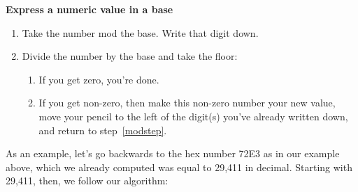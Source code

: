 \vspace{.1in}
\begin{framed}
\begin{samepage}
\textbf{Express a numeric value in a base}
\label{convertalgorithm}
\begin{enumerate}
\item \label{modstep} Take the number mod the base. Write that digit down.
\item \label{divstep} Divide the number by the base and take the floor:
    \begin{enumerate}
    \item \label{zerostep} If you get zero, you're done.
    \item \label{notzerostep} If you get non-zero, then make this non-zero
number your new value, move your pencil to the left of the digit(s) you've
already written down, and return to step~\ref{modstep}.
    \end{enumerate}
\end{enumerate}
\end{samepage}
\end{framed}
\vspace{.2in}

As an example, let's go backwards to the hex number 72E3 as in our example
above, which we already computed was equal to 29,411 in decimal. Starting
with 29,411, then, we follow our algorithm:

